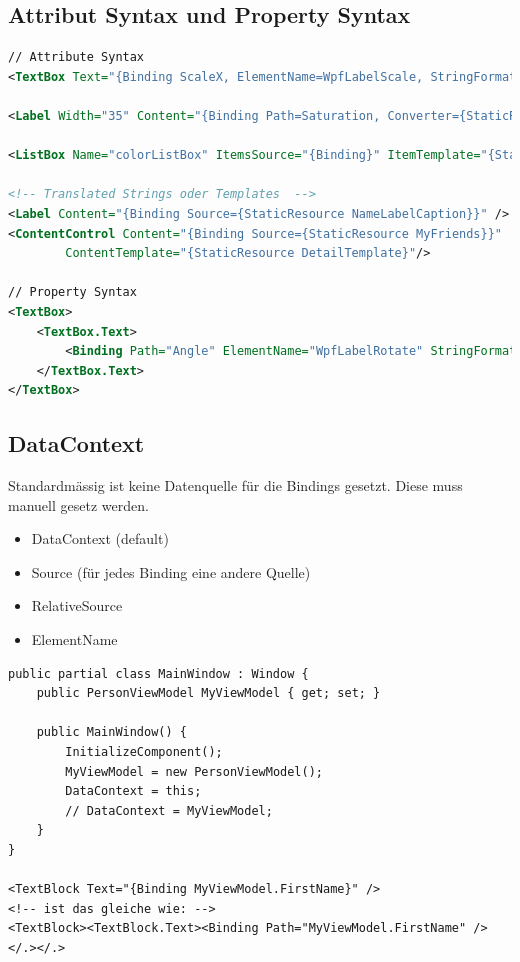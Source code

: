 \subsection{Attribut Syntax und Property Syntax}
\begin{lstlisting}[caption=Data Binding, language=XML]
// Attribute Syntax
<TextBox Text="{Binding ScaleX, ElementName=WpfLabelScale, StringFormat={}{0:0.0} }"/>

<Label Width="35" Content="{Binding Path=Saturation, Converter={StaticResource DoubleToString}}"/>

<ListBox Name="colorListBox" ItemsSource="{Binding}" ItemTemplate="{StaticResource ColorItemTemplate}" />

<!-- Translated Strings oder Templates  -->
<Label Content="{Binding Source={StaticResource NameLabelCaption}}" />
<ContentControl Content="{Binding Source={StaticResource MyFriends}}"
		ContentTemplate="{StaticResource DetailTemplate}"/>

// Property Syntax
<TextBox>
	<TextBox.Text>
		<Binding Path="Angle" ElementName="WpfLabelRotate" StringFormat="{}{0:0.0}" />
	</TextBox.Text>
</TextBox>
\end{lstlisting}


\subsection{DataContext}
Standardmässig ist keine Datenquelle für die Bindings gesetzt. Diese muss manuell gesetz werden.
\begin{itemize}
	\item DataContext (default)
	\item Source (für jedes Binding eine andere Quelle)
	\item RelativeSource
	\item ElementName
\end{itemize}

\begin{lstlisting}[caption=Data Binding]
public partial class MainWindow : Window {
	public PersonViewModel MyViewModel { get; set; }
	
	public MainWindow() {
		InitializeComponent();
		MyViewModel = new PersonViewModel();
		DataContext = this; 
		// DataContext = MyViewModel;
	}
}

<TextBlock Text="{Binding MyViewModel.FirstName}" />
<!-- ist das gleiche wie: -->
<TextBlock><TextBlock.Text><Binding Path="MyViewModel.FirstName" /></.></.>
\end{lstlisting}


